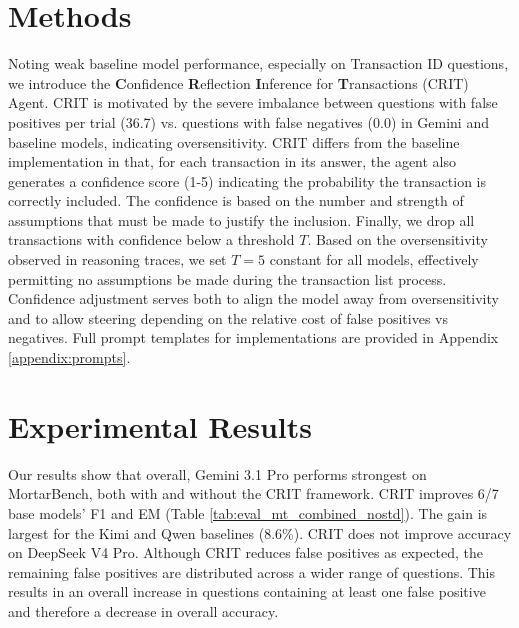 \documentclass[11pt]{article}
\begin{document}
\section{Methods}

Noting weak baseline model performance, especially on Transaction ID questions, we introduce the \textbf{C}onfidence \textbf{R}eflection \textbf{I}nference for \textbf{T}ransactions (CRIT) Agent.
CRIT is motivated by the severe imbalance between questions with false positives per trial (36.7) vs. questions with false negatives (0.0) in Gemini and baseline models, indicating oversensitivity.
CRIT differs from the baseline implementation in that, for each transaction in its answer, the agent also generates a confidence score (1-5) indicating the probability the transaction is correctly included.
The confidence is based on the number and strength of assumptions that must be made to justify the inclusion.
Finally, we drop all transactions with confidence below a threshold $T$.
Based on the oversensitivity observed in reasoning traces, we set $T=5$ constant for all models, effectively permitting no assumptions be made during the transaction list process.
Confidence adjustment serves both to align the model away from oversensitivity and to allow steering depending on the relative cost of false positives vs negatives.
Full prompt templates for implementations are provided in Appendix \ref{appendix:prompts}.


\section{Experimental Results}



Our results show that overall, Gemini 3.1 Pro performs strongest on MortarBench, both with and without the CRIT framework.
CRIT improves 6/7 base models' F1 and EM (Table \ref{tab:eval_mt_combined_nostd}).
The gain is largest for the Kimi and Qwen baselines (8.6\%).
CRIT does not improve accuracy on DeepSeek V4 Pro. 
Although CRIT reduces false positives as expected, the remaining false positives are distributed across a wider range of questions.
This results in an overall increase in questions containing at least one false positive and therefore a decrease in overall accuracy. 
\end{document}

